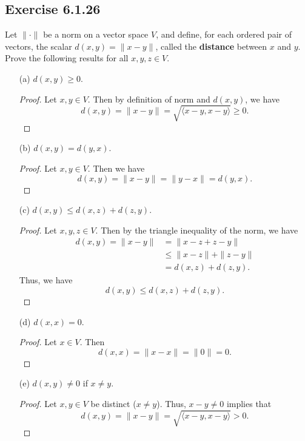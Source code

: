 \subsection*{Exercise 6.1.26} Let \( \| \cdot \|  \) be a norm on a vector space \( V  \), and define, for each ordered pair of vectors, the scalar \( d(x,y) = \|x - y\| \), called the \textbf{distance} between \( x  \) and \( y  \). Prove the following results for all \( x,y,z \in V  \).
\begin{enumerate}
    \item[(a)] \( d(x,y) \geq 0  \).
        \begin{proof}
        Let \( x,y \in V  \). Then by definition of norm and \( d(x,y) \), we have
        \[  d(x,y) = \|x - y\| = \sqrt{ \langle x - y  ,  x -y  \rangle  } \geq 0.   \]
        \end{proof}
    \item[(b)] \( d(x,y) = d(y,x) \).
        \begin{proof}
        Let \( x,y \in V  \). Then we have
        \[  d(x,y) = \|x - y\| = \|y-x\| = d(y,x). \]
        \end{proof}
    \item[(c)] \( d(x,y) \leq d(x,z) + d(z,y) \).
        \begin{proof}
        Let \( x,y,z \in V  \). Then by the triangle inequality of the norm, we have
        \begin{align*}
            d(x,y) = \| x - y \|  &=  \| x - z + z - y \|  \\
                                  &\leq \| x - z \| + \| z - y\| \\
                                  &= d(x,z) + d(z,y).
        \end{align*}
        Thus, we have
        \[  d(x,y) \leq d(x,z) + d(z,y). \]
        \end{proof}
    \item[(d)] \( d(x,x) = 0  \).
        \begin{proof}
        Let \( x \in V  \). Then
        \[  d(x,x) = \|x - x \| = \| 0\| = 0. \]
        \end{proof}
    \item[(e)] \( d(x,y) \neq 0  \) if \( x \neq y  \).
        \begin{proof}
        Let \( x,y \in V   \) be distinct (\( x \neq y \)). Thus, \( x - y \neq 0 \) implies that 
        \[  d(x,y) = \|x -y\| = \sqrt{ \langle x-y , x -y \rangle  }  > 0. \]
        \end{proof}
\end{enumerate}

